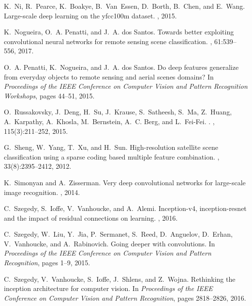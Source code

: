 \documentclass[journal]{IEEEtran}
\begin{document}
\begin{thebibliography}{1}
K.~Ni, R.~Pearce, K.~Boakye, B.~Van~Essen, D.~Borth, B.~Chen, and E.~Wang.
\newblock Large-scale deep learning on the yfcc100m dataset.
, 2015.

K.~Nogueira, O.~A. Penatti, and J.~A. dos Santos.
\newblock Towards better exploiting convolutional neural networks for remote
  sensing scene classification.
, 61:539--556, 2017.

O.~A. Penatti, K.~Nogueira, and J.~A. dos Santos.
\newblock Do deep features generalize from everyday objects to remote sensing
  and aerial scenes domains?
\newblock In {\em Proceedings of the IEEE Conference on Computer Vision and
  Pattern Recognition Workshops}, pages 44--51, 2015.

O.~Russakovsky, J.~Deng, H.~Su, J.~Krause, S.~Satheesh, S.~Ma, Z.~Huang,
  A.~Karpathy, A.~Khosla, M.~Bernstein, A.~C. Berg, and L.~Fei-Fei.
.
,
  115(3):211--252, 2015.

G.~Sheng, W.~Yang, T.~Xu, and H.~Sun.
\newblock High-resolution satellite scene classification using a sparse coding
  based multiple feature combination.
, 33(8):2395--2412,
  2012.

K.~Simonyan and A.~Zisserman.
\newblock Very deep convolutional networks for large-scale image recognition.
, 2014.

C.~Szegedy, S.~Ioffe, V.~Vanhoucke, and A.~Alemi.
\newblock Inception-v4, inception-resnet and the impact of residual connections
  on learning.
, 2016.

C.~Szegedy, W.~Liu, Y.~Jia, P.~Sermanet, S.~Reed, D.~Anguelov, D.~Erhan,
  V.~Vanhoucke, and A.~Rabinovich.
\newblock Going deeper with convolutions.
\newblock In {\em Proceedings of the IEEE Conference on Computer Vision and
  Pattern Recognition}, pages 1--9, 2015.

C.~Szegedy, V.~Vanhoucke, S.~Ioffe, J.~Shlens, and Z.~Wojna.
\newblock Rethinking the inception architecture for computer vision.
\newblock In {\em Proceedings of the IEEE Conference on Computer Vision and
  Pattern Recognition}, pages 2818--2826, 2016.


\end{thebibliography}
\end{document}
